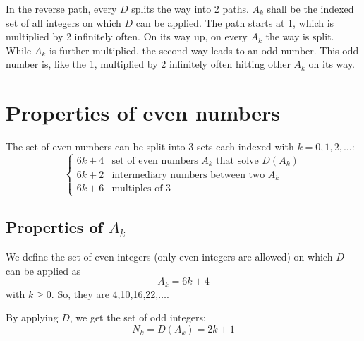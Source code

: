 \documentclass[10pt,a4paper]{article}
\begin{document}
In the reverse path, every $D$ splits the way into 2 paths. $A_k$ shall be the indexed set of all integers on which $D$ can be applied.
The path starts at 1, which is multiplied by 2 infinitely often. On its way up, on every $A_k$ the way is split. While $A_k$ is further multiplied, the second way leads to an odd number. This odd number is, like the 1, multiplied by 2 infinitely often hitting other $A_k$ on its way.
\section{Properties of even numbers}
The set of even numbers can be split into 3 sets each indexed with $k=0,1,2,\ldots$:
\begin{equation}
 \begin{cases}
	 6k+4 & \text{set of even numbers } A_k \text{ that solve } D(A_k) \\
	 6k+2 & \text{intermediary numbers between two } A_k \\
	 6k+6 & \text{multiples of 3}
 \end{cases}
\label{eq:6kcases}
\end{equation}
\subsection{Properties of $A_k$}

We define the set of even integers (only even integers are allowed) on which $D$ can be applied as
\begin{equation}
A_k=6k+4
\label{eqAkdef}
\end{equation}
with $k\ge0$. So, they are 4,10,16,22,$\ldots$.

By applying $D$, we get the set of odd integers:
\begin{equation}
N_k=D(A_k)=2k+1
\label{eqNk}
\end{equation}
\end{document}

